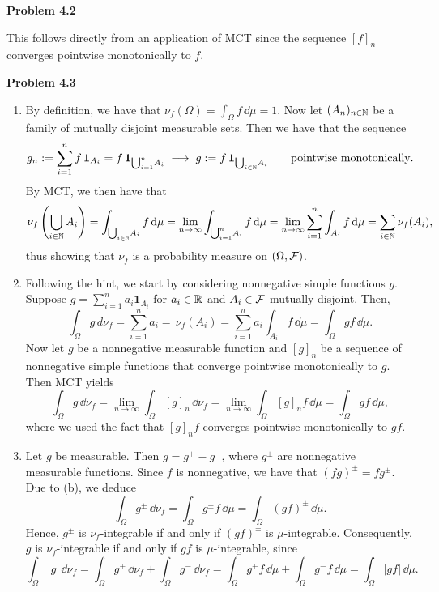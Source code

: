 \textbf{Problem 4.2}

This follows directly from an application of MCT since the sequence $[f]_n$ converges pointwise monotonically to $f$.

\bigskip
\textbf{Problem 4.3}

\begin{enumerate}[label={(\alph*)}]
	\item By definition, we have that $\nu_f(\Omega) = \int_\Omega f\,\dd\mu = 1$. Now let $(A_n)_{n\in\mathbb N}$ be a family of mutually disjoint measurable sets. Then we have that the sequence 
	\[
		g_n:= \sum_{i=1}^n f\,\mathbf{1}_{A_i} = f\,\mathbf{1}_{\bigcup_{i=1}^n\! A_i}\;\longrightarrow\; g:= f\,\mathbf{1}_{\bigcup_{i\in\mathbb N}\! A_i}\qquad\text{pointwise monotonically}.
	\]
	By MCT, we then have that
	\[
		\nu_f\left(\bigcup_{i\in\mathbb N} A_i\right) = \int_{\bigcup_{i\in\mathbb N}\! A_i} f\,\mathrm{d}\mu = \lim_{n\to\infty} \int_{\bigcup_{i=1}^n\! A_i} f\,\mathrm{d}\mu = \lim_{n\to\infty} \sum_{i=1}^n \int_{A_i} f\,\mathrm{d}\mu = \sum_{i\in\mathbb N}\nu_f(A_i),
	\]
	thus showing that $\nu_f$ is a probability measure on $(\Omega,\mathcal F)$.
	
	\item Following the hint, we start by considering nonnegative simple functions $g$. Suppose $g=\sum_{i=1}^n a_i \mathbf{1}_{A_i}$ for $a_i\in\mathbb R$ and $A_i\in\mathcal F$ mutually disjoint. Then,
	\[
		\int_\Omega g\,d\nu_f = \sum_{i=1}^n a_i =\,\nu_f(A_i) = \sum_{i=1}^n a_i\int_{A_i} f\,\dd\mu = \int_\Omega gf\,\dd\mu.
	\]
	Now let $g$ be a nonnegative measurable function and $[g]_n$ be a sequence of nonnegative simple functions that converge pointwise monotonically to $g$. Then MCT yields
	\[
		\int_\Omega g\,\dd\nu_f = \lim_{n\to\infty}\int_\Omega [g]_n\,\dd\nu_f = \lim_{n\to\infty} \int_\Omega [g]_n f\,\dd\mu = \int_\Omega gf\,\dd\mu,
	\]
	where we used the fact that $[g]_n f$ converges pointwise monotonically to $gf$.
	
	\item Let $g$ be measurable. Then $g=g^+-g^-$, where $g^\pm$ are nonnegative measurable functions. Since $f$ is nonnegative, we have that $(fg)^\pm = f g^\pm$. Due to (b), we deduce
	\[
		\int_\Omega g^\pm\,\dd\nu_f = \int_\Omega g^\pm f\,\dd\mu = \int_\Omega (gf)^\pm\,\dd\mu.
	\]
	Hence, $g^\pm$ is $\nu_f$-integrable if and only if $(gf)^\pm$ is $\mu$-integrable. Consequently, $g$ is $\nu_f$-integrable if and only if $gf$ is $\mu$-integrable, since
	\[
		\int_\Omega |g|\,\dd\nu_f = \int_\Omega g^+\,\dd\nu_f + \int_\Omega g^-\,\dd\nu_f = \int_\Omega g^+f\,\dd\mu + \int_\Omega g^-f\,\dd\mu = \int_\Omega |gf|\,\dd\mu.
	\]
\end{enumerate}

